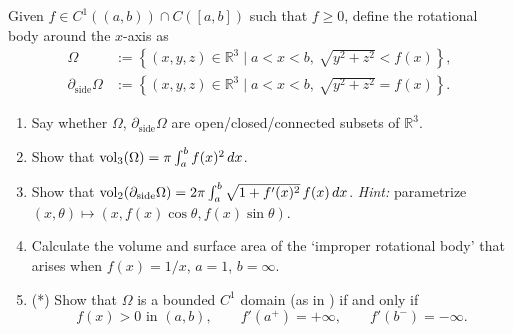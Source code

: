 \begin{exercise}
\label{ex:solids_of_revolution_area}
Given $f \in C^1((a,b))\cap C([a,b])$ such that $f\geq0$, define the \textnormal{rotational
body around the $x$-axis} as
\[\begin{aligned}
  \Omega &:= \left\{(x,y,z)\in\mathbb{R}^3 \mid a<x<b,\ \sqrt{y^2+z^2}<f(x)\right\}, \\
  \partial_{\mathrm{side}}\Omega &:= \left\{(x,y,z)\in\mathbb{R}^3 \mid a<x<b,\ \sqrt{y^2+z^2}=f(x)\right\}.
\end{aligned}\]
\begin{enumerate}[label=\textbf{(\alph*)}]
  \item Say whether $\Omega$, $\partial_{\mathrm{side}}\Omega$ are open/closed/connected
    subsets of $\mathbb{R}^3$.
  \item Show that $\operatorname{vol}_3(\Omega) = \pi\int_a^b f(x)^2\,dx$.
  \item Show that $\operatorname{vol}_2(\partial_{\mathrm{side}}\Omega) = 2\pi\int_a^b
    \sqrt{1+f'(x)^2}\,f(x)\,dx$. \textit{Hint:} parametrize $(x,\theta)\mapsto (x,f(x)\cos\theta,
    f(x)\sin\theta)$.
  \item Calculate the volume and surface area of the `improper rotational body' that arises
    when $f(x)=1/x$, $a=1$, $b=\infty$.
  \item \textnormal{(*)} Show that $\Omega$ is a bounded $C^1$ domain (as in
    ) if and only if
    \begin{equation}
    f(x)>0 \text{ in } (a,b), \qquad f'(a^+)=+\infty, \qquad f'(b^-)=-\infty. \tag{$*$}
    \end{equation}
\end{enumerate}
\end{exercise}
